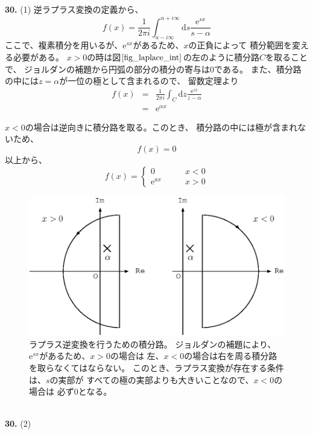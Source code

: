 \documentclass{jarticle}
\newcommand{\diff}{\mathrm d}
\newcommand{\ans}[2]{\noindent\\ {\bf \large #1.} (#2)}
\newcommand{\e}{\mathrm e}
\begin{document}
\ans{30}{1}
逆ラプラス変換の定義から、
\begin{equation}
  f(x) = \frac{1}{2 \pi i} \int_{a-i\infty}^{\alpha+i\infty} \diff s \frac{\e^{sx}}{s-\alpha}
\end{equation}
ここで、複素積分を用いるが、$\e^{sx}$があるため、$x$の正負によって
積分範囲を変える必要がある。
$x>0$の時は図$\ref{fig_laplace_int}$の左のように積分路$C$を取ることで、
ジョルダンの補題から円弧の部分の積分の寄与は$0$である。
また、積分路の中には$z=\alpha$が一位の極として含まれるので、
留数定理より
\begin{eqnarray}
  f(x) &=& \frac{1}{2 \pi i} \int_C \diff z \frac{\e^{zx}}{z-\alpha}\\
  &=& \e^{\alpha x}
\end{eqnarray}

$x<0$の場合は逆向きに積分路を取る。このとき、
積分路の中には極が含まれないため、
\begin{equation}
  f(x) = 0
\end{equation}
以上から、
\begin{equation}
  f(x) = \left\{
  \begin{array}{cc}
    0       & \qquad x<0 \\
    \e^{ax} & \qquad x>0
  \end{array}
  \right.
\end{equation}


\begin{figure}[htbp]
  \begin{center}
    \includegraphics[width=.5\linewidth]{fig/laplace_int.eps}
  \end{center}
  \caption{
    ラプラス逆変換を行うための積分路。
    ジョルダンの補題により、$\e^{sx}$があるため、$x>0$の場合は
    左、$x<0$の場合は右を周る積分路を取らなくてはならない。
    このとき、ラプラス変換が存在する条件は、$s$の実部が
    すべての極の実部よりも大きいことなので、$x<0$の場合は
    必ず$0$となる。
  }
  \label{fig_laplace_int}
\end{figure}

\ans{30}{2}
\end{document}

